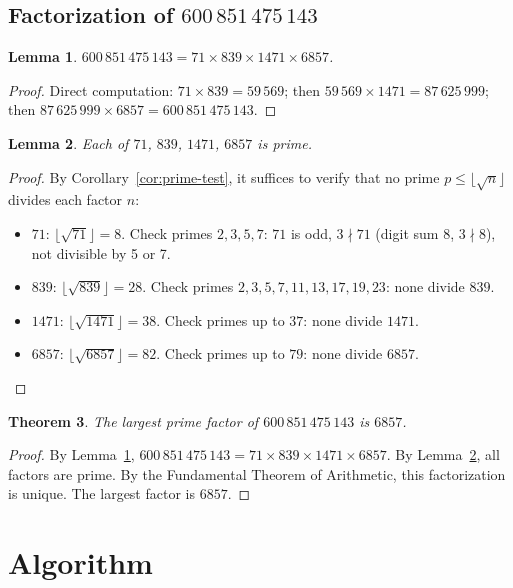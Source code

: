 \documentclass[11pt]{article}
\newtheorem{theorem}{Theorem}
\newtheorem{lemma}[theorem]{Lemma}
\begin{document}
\subsection{Factorization of $600\,851\,475\,143$}

\begin{lemma}
\label{lem:factorization}
$600\,851\,475\,143 = 71 \times 839 \times 1471 \times 6857$.
\end{lemma}

\begin{proof}
Direct computation: $71 \times 839 = 59\,569$; then $59\,569 \times 1471 = 87\,625\,999$; then $87\,625\,999 \times 6857 = 600\,851\,475\,143$.
\end{proof}

\begin{lemma}
\label{lem:primes}
Each of $71$, $839$, $1471$, $6857$ is prime.
\end{lemma}

\begin{proof}
By Corollary~\ref{cor:prime-test}, it suffices to verify that no prime $p \le \lfloor\sqrt{n}\rfloor$ divides each factor $n$:
\begin{itemize}
    \item $71$: $\lfloor\sqrt{71}\rfloor = 8$. Check primes $2,3,5,7$: $71$ is odd, $3 \nmid 71$ (digit sum $8$, $3\nmid 8$), not divisible by 5 or 7.
    \item $839$: $\lfloor\sqrt{839}\rfloor = 28$. Check primes $2,3,5,7,11,13,17,19,23$: none divide $839$.
    \item $1471$: $\lfloor\sqrt{1471}\rfloor = 38$. Check primes up to $37$: none divide $1471$.
    \item $6857$: $\lfloor\sqrt{6857}\rfloor = 82$. Check primes up to $79$: none divide $6857$.
\end{itemize}
\end{proof}

\begin{theorem}
The largest prime factor of $600\,851\,475\,143$ is $6857$.
\end{theorem}

\begin{proof}
By Lemma~\ref{lem:factorization}, $600\,851\,475\,143 = 71 \times 839 \times 1471 \times 6857$. By Lemma~\ref{lem:primes}, all factors are prime. By the Fundamental Theorem of Arithmetic, this factorization is unique. The largest factor is $6857$.
\end{proof}

\section{Algorithm}
\end{document}
